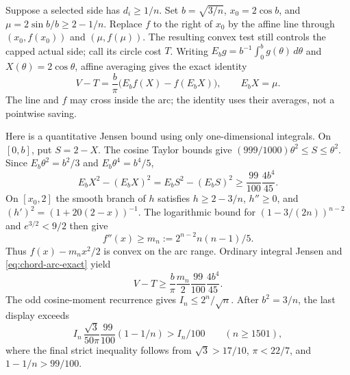 \documentclass[11pt]{article}
\begin{document}
	Suppose a selected side has $d_i\geq1/n$.  Set
	$b=\sqrt{3/n}$, $x_0=2\cos b$, and
	$\mu=2\sin b/b\geq2-1/n$.  Replace $f$ to the right of
	$x_0$ by the affine line through $(x_0,f(x_0))$ and
	$(\mu,f(\mu))$.  The resulting convex test still controls
	the capped actual side; call its circle cost $T$.
	Writing $E_b g=b^{-1}\int_0^b g(\theta)\,d\theta$ and
	$X(\theta)=2\cos\theta$, affine averaging gives the exact identity
	\begin{equation}\label{eq:chord-arc-exact}
		V-T=\frac b\pi\bigl(E_b f(X)-f(E_bX)\bigr),
		\qquad E_bX=\mu .
	\end{equation}
	The line and $f$ may cross inside the arc; the identity uses their
	averages, not a pointwise saving.
	
	Here is a quantitative Jensen bound using only one-dimensional
	integrals.  On $[0,b]$, put $S=2-X$.  The cosine Taylor bounds give
	$(999/1000)\theta^2\leq S\leq\theta^2$.  Since
	$E_b\theta^2=b^2/3$ and $E_b\theta^4=b^4/5$,
	\[
	E_bX^2-(E_bX)^2=E_bS^2-(E_bS)^2
	\geq\frac{99}{100}\frac{4b^4}{45}.
	\]
	On $[x_0,2]$ the smooth branch of $h$ satisfies
	$h\geq2-3/n$, $h''\geq0$, and
	$(h')^2=(1+20(2-x))^{-1}$.  The logarithmic bound for
	$(1-3/(2n))^{n-2}$ and $e^{3/2}<9/2$ then give
	\[
	f''(x)\geq m_n:=2^{n-2}n(n-1)/5.
	\]
	Thus $f(x)-m_nx^2/2$ is convex on the arc range.  Ordinary
	integral Jensen and \eqref{eq:chord-arc-exact} yield
	\[
	V-T\geq\frac b\pi\frac{m_n}{2}
	\frac{99}{100}\frac{4b^4}{45}.
	\]
	The odd cosine-moment recurrence gives $I_n\leq2^n/\sqrt n$.
	After $b^2=3/n$, the last display exceeds
	\[
	I_n\,\frac{\sqrt3}{50\pi}\frac{99}{100}
	(1-1/n)>I_n/100
	\qquad(n\geq1501),
	\]
	where the final strict inequality follows from
	$\sqrt3>17/10$, $\pi<22/7$, and $1-1/n>99/100$.
	
\end{document}

